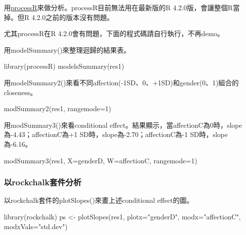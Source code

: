 \documentclass[
]{book}
\newenvironment{Shaded}{\begin{snugshade}}{\end{snugshade}}
\newcommand{\AttributeTok}[1]{\textcolor[rgb]{0.77,0.63,0.00}{#1}}
\newcommand{\DecValTok}[1]{\textcolor[rgb]{0.00,0.00,0.81}{#1}}
\newcommand{\FunctionTok}[1]{\textcolor[rgb]{0.00,0.00,0.00}{#1}}
\newcommand{\NormalTok}[1]{#1}
\newcommand{\OtherTok}[1]{\textcolor[rgb]{0.56,0.35,0.01}{#1}}
\newcommand{\StringTok}[1]{\textcolor[rgb]{0.31,0.60,0.02}{#1}}
\begin{document}
用\href{https://cran.r-project.org/web/packages/processR/index.html}{processR}來做分析。processR目前無法用在最新版的R 4.2.0版，會讓整個R當掉。但R 4.2.0之前的版本沒有問題。

尤其processR在R 4.2.0會有問題，下面的程式碼請自行執行，不再demo。

用modelSummary()來整理迴歸的結果表。

\begin{Shaded}
\begin{Highlighting}[]
\FunctionTok{library}\NormalTok{(processR)}
\FunctionTok{modelsSummary}\NormalTok{(res1)}
\end{Highlighting}
\end{Shaded}

用modelSummary2()來看不同affection(-1SD、0、+1SD)和gender(0、1)組合的closeness。

\begin{Shaded}
\begin{Highlighting}[]
\FunctionTok{modSummary2}\NormalTok{(res1, }\AttributeTok{rangemode=}\DecValTok{1}\NormalTok{)}
\end{Highlighting}
\end{Shaded}

用modSummary3()來看conditional effect。結果顯示，當affectionC為0時，slope為-4.43；affectionC為+1 SD時，slope為-2.70；affectionC為-1 SD時，slope為-6.16。

\begin{Shaded}
\begin{Highlighting}[]
\FunctionTok{modSummary3}\NormalTok{(res1, }\AttributeTok{X=}\StringTok{\textquotesingle{}genderD\textquotesingle{}}\NormalTok{, }\AttributeTok{W=}\StringTok{\textquotesingle{}affectionC\textquotesingle{}}\NormalTok{, }\AttributeTok{rangemode=}\DecValTok{1}\NormalTok{)}
\end{Highlighting}
\end{Shaded}

\hypertarget{ux4ee5rockchalkux5957ux4ef6ux5206ux6790}{%
\subsubsection{以rockchalk套件分析}\label{ux4ee5rockchalkux5957ux4ef6ux5206ux6790}}

以rockchalk套件的plotSlopes()來畫上述conditional effect的圖。

\begin{Shaded}
\begin{Highlighting}[]
\FunctionTok{library}\NormalTok{(rockchalk)}
\NormalTok{ps }\OtherTok{\textless{}{-}} \FunctionTok{plotSlopes}\NormalTok{(res1, }\AttributeTok{plotx=}\StringTok{"genderD"}\NormalTok{, }\AttributeTok{modx=}\StringTok{"affectionC"}\NormalTok{, }\AttributeTok{modxVals=}\StringTok{"std.dev"}\NormalTok{)}
\end{Highlighting}
\end{Shaded}
\end{document}
